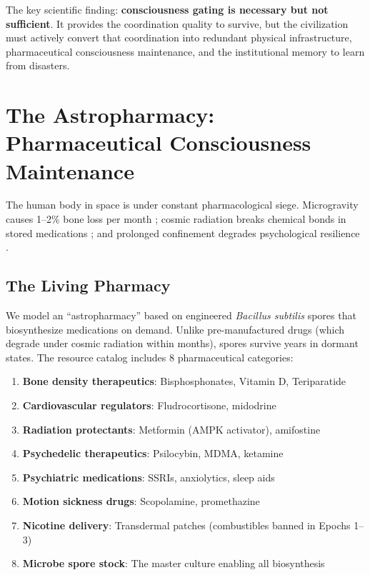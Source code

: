 \documentclass[12pt,a4paper]{article}
\begin{document}
The key scientific finding: \textbf{consciousness gating is necessary but not sufficient}. It provides the coordination quality to survive, but the civilization must actively convert that coordination into redundant physical infrastructure, pharmaceutical consciousness maintenance, and the institutional memory to learn from disasters.


\section{The Astropharmacy: Pharmaceutical Consciousness Maintenance}
\label{sec:astropharmacy}

The human body in space is under constant pharmacological siege. Microgravity causes 1--2\% bone loss per month \citep{sibonga2015spaceflight}; cosmic radiation breaks chemical bonds in stored medications \citep{chancellor2014space}; and prolonged confinement degrades psychological resilience \citep{basner2014mars}.

\subsection{The Living Pharmacy}

We model an ``astropharmacy'' based on engineered \textit{Bacillus subtilis} spores that biosynthesize medications on demand. Unlike pre-manufactured drugs (which degrade under cosmic radiation within months), spores survive years in dormant states. The resource catalog includes 8 pharmaceutical categories:

\begin{enumerate}    \item \textbf{Bone density therapeutics}: Bisphosphonates, Vitamin D, Teriparatide
    \item \textbf{Cardiovascular regulators}: Fludrocortisone, midodrine
    \item \textbf{Radiation protectants}: Metformin (AMPK activator), amifostine
    \item \textbf{Psychedelic therapeutics}: Psilocybin, MDMA, ketamine
    \item \textbf{Psychiatric medications}: SSRIs, anxiolytics, sleep aids
    \item \textbf{Motion sickness drugs}: Scopolamine, promethazine
    \item \textbf{Nicotine delivery}: Transdermal patches (combustibles banned in Epochs 1--3)
    \item \textbf{Microbe spore stock}: The master culture enabling all biosynthesis
\end{enumerate}
\end{document}
